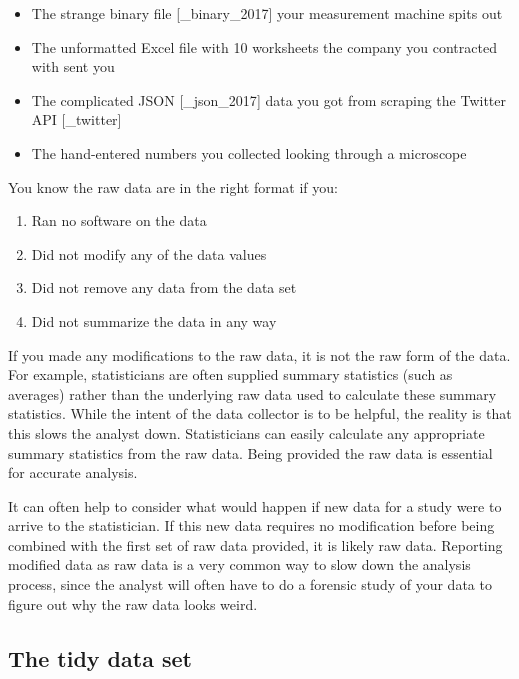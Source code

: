 \documentclass[12pt]{article}
\providecommand{\tightlist}{%
  \setlength{\itemsep}{0pt}\setlength{\parskip}{0pt}}
\begin{document}
\begin{itemize}
\tightlist
\item
  The strange binary file {[}\_binary\_2017{]} your measurement machine
  spits out
\item
  The unformatted Excel file with 10 worksheets the company you
  contracted with sent you
\item
  The complicated JSON {[}\_json\_2017{]} data you got from scraping the
  Twitter API {[}\_twitter{]}
\item
  The hand-entered numbers you collected looking through a microscope
\end{itemize}

You know the raw data are in the right format if you:

\begin{enumerate}
\def\labelenumi{\arabic{enumi}.}
\tightlist
\item
  Ran no software on the data
\item
  Did not modify any of the data values
\item
  Did not remove any data from the data set
\item
  Did not summarize the data in any way
\end{enumerate}

If you made any modifications to the raw data, it is not the raw form of
the data. For example, statisticians are often supplied summary
statistics (such as averages) rather than the underlying raw data used
to calculate these summary statistics. While the intent of the data
collector is to be helpful, the reality is that this slows the analyst
down. Statisticians can easily calculate any appropriate summary
statistics from the raw data. Being provided the raw data is essential
for accurate analysis.

It can often help to consider what would happen if new data for a study
were to arrive to the statistician. If this new data requires no
modification before being combined with the first set of raw data
provided, it is likely raw data. Reporting modified data as raw data is
a very common way to slow down the analysis process, since the analyst
will often have to do a forensic study of your data to figure out why
the raw data looks weird.

\subsection{The tidy data set}\label{the-tidy-data-set}
\end{document}
